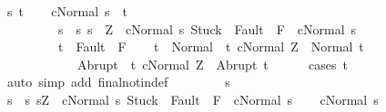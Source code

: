\begin{isabellebody}
\ s\ t\isanewline
\ \ \isamarkupfalse%
\ {\isachardoublequoteopen}{\isasymGamma}{\isasymturnstile}{\isasymlangle}c{\isacharcomma}Normal\ s{\isasymrangle}\ {\isasymRightarrow}\ t{\isachardoublequoteclose}\ \isanewline
\ \ \ \ \ \ \ \ \ {\isachardoublequoteopen}s\ {\isasymin}\ {\isacharbraceleft}s{\isachardot}\ s\ {\isacharequal}\ Z\ {\isasymand}\ {\isasymGamma}{\isasymturnstile}{\isasymlangle}c{\isacharcomma}Normal\ s{\isasymrangle}\ {\isasymRightarrow}{\isasymnotin}{\isacharparenleft}{\isacharbraceleft}Stuck{\isacharbraceright}\ {\isasymunion}\ Fault\ {\isacharbackquote}\ {\isacharparenleft}{\isacharminus}F{\isacharparenright}{\isacharparenright}\ {\isasymand}\ {\isasymGamma}{\isasymturnstile}c{\isasymdown}Normal\ s{\isacharbraceright}{\isachardoublequoteclose}\isanewline
\ \ \ \ \ \ \ \ \ {\isachardoublequoteopen}t\ {\isasymnotin}\ Fault\ {\isacharbackquote}\ F{\isachardoublequoteclose}\isanewline
\ \ \isamarkupfalse%
\ {\isachardoublequoteopen}t\ {\isasymin}\ Normal\ {\isacharbackquote}\ {\isacharbraceleft}t{\isachardot}\ {\isasymGamma}{\isasymturnstile}{\isasymlangle}c{\isacharcomma}Normal\ Z{\isasymrangle}\ {\isasymRightarrow}\ Normal\ t{\isacharbraceright}\ {\isasymunion}\ \isanewline
\ \ \ \ \ \ \ \ \ \ \ \ Abrupt\ {\isacharbackquote}\ {\isacharbraceleft}t{\isachardot}\ {\isasymGamma}{\isasymturnstile}{\isasymlangle}c{\isacharcomma}Normal\ Z{\isasymrangle}\ {\isasymRightarrow}\ Abrupt\ t{\isacharbraceright}{\isachardoublequoteclose}\isanewline
\ \ \ \ \isamarkupfalse%
\ {\isacharparenleft}cases\ t{\isacharparenright}\ \isanewline
\ \ \ \ \isamarkupfalse%
\ {\isacharparenleft}auto\ simp\ add{\isacharcolon}\ final{\isacharunderscore}notin{\isacharunderscore}def{\isacharparenright}\isanewline
\ \ \ \ \isamarkupfalse%
\isanewline
{}\isamarkupfalse%
\isanewline
\ \ \isamarkupfalse%
\ s\isanewline
\ \ \isamarkupfalse%
\ {\isachardoublequoteopen}s\ {\isasymin}\ {\isacharbraceleft}s{\isachardot}\ s{\isacharequal}Z\ {\isasymand}\ {\isasymGamma}{\isasymturnstile}{\isasymlangle}c{\isacharcomma}Normal\ s{\isasymrangle}\ {\isasymRightarrow}{\isasymnotin}{\isacharparenleft}{\isacharbraceleft}Stuck{\isacharbraceright}\ {\isasymunion}\ Fault\ {\isacharbackquote}\ {\isacharparenleft}{\isacharminus}F{\isacharparenright}{\isacharparenright}\ {\isasymand}\ {\isasymGamma}{\isasymturnstile}c{\isasymdown}Normal\ s{\isacharbraceright}{\isachardoublequoteclose}\isanewline
\ \ \isamarkupfalse%
\ {\isachardoublequoteopen}{\isasymGamma}{\isasymturnstile}c{\isasymdown}Normal\ s{\isachardoublequoteclose}\isanewline

\end{isabellebody}
